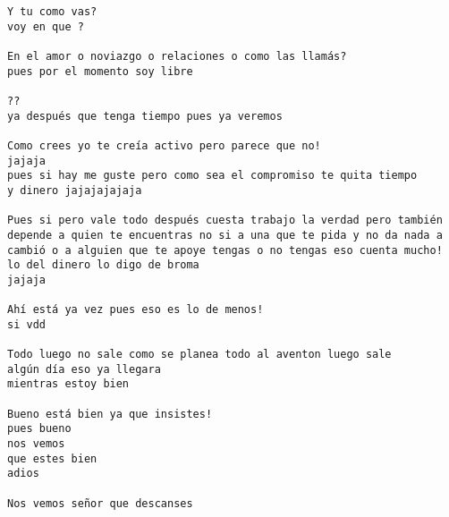 \begin{verbatim}
Y tu como vas?
voy en que ?

En el amor o noviazgo o relaciones o como las llamás?
pues por el momento soy libre

??
ya después que tenga tiempo pues ya veremos

Como crees yo te creía activo pero parece que no!
jajaja
pues si hay me guste pero como sea el compromiso te quita tiempo
y dinero jajajajajaja

Pues si pero vale todo después cuesta trabajo la verdad pero también depende a quien te encuentras no si a una que te pida y no da nada a cambió o a alguien que te apoye tengas o no tengas eso cuenta mucho!
lo del dinero lo digo de broma
jajaja

Ahí está ya vez pues eso es lo de menos!
si vdd

Todo luego no sale como se planea todo al aventon luego sale
algún día eso ya llegara
mientras estoy bien

Bueno está bien ya que insistes!
pues bueno
nos vemos
que estes bien
adios

Nos vemos señor que descanses
\end{verbatim}
